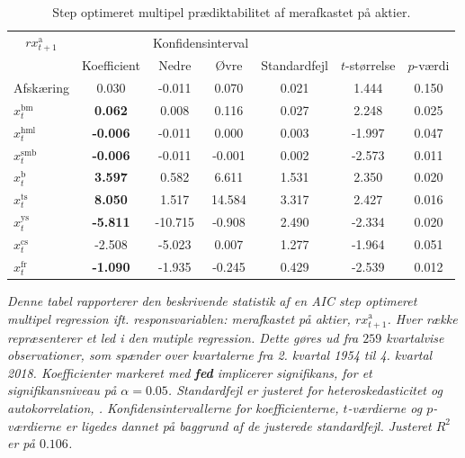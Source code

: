 \documentclass[
  a4paper,
  oneside]{memoir}
\begin{document}
\begin{table}[H]

\caption{\label{tab:MULT-step-ak}Step optimeret multipel prædiktabilitet af merafkastet på aktier.}
\centering
\begin{threeparttable}
\begin{tabular}[t]{lcccccc}
\toprule
\multicolumn{1}{c}{$rx_{t+1}^{\text{a}}$} & \multicolumn{1}{c}{ } & \multicolumn{2}{c}{Konfidensinterval} & \multicolumn{3}{c}{ } \\
\cmidrule(l{3pt}r{3pt}){1-1} \cmidrule(l{3pt}r{3pt}){3-4}
  & Koefficient & Nedre & Øvre & Standardfejl & $t$-størrelse & $p$-værdi\\
\midrule
\rowcolor{gray!6}  Afskæring & 0.030 & -0.011 & 0.070 & 0.021 & 1.444 & 0.150\\
$x_t^{\text{bm}}$ & \textbf{ 0.062} & 0.008 & 0.116 & 0.027 & 2.248 & 0.025\\
\rowcolor{gray!6}  $x_t^{\text{hml}}$ & \textbf{-0.006} & -0.011 & 0.000 & 0.003 & -1.997 & 0.047\\
$x_t^{\text{smb}}$ & \textbf{-0.006} & -0.011 & -0.001 & 0.002 & -2.573 & 0.011\\
\rowcolor{gray!6}  $x_t^{\text{b}}$ & \textbf{ 3.597} & 0.582 & 6.611 & 1.531 & 2.350 & 0.020\\
$x_t^{\text{ts}}$ & \textbf{ 8.050} & 1.517 & 14.584 & 3.317 & 2.427 & 0.016\\
\rowcolor{gray!6}  $x_t^{\text{ys}}$ & \textbf{-5.811} & -10.715 & -0.908 & 2.490 & -2.334 & 0.020\\
$x_t^{\text{cs}}$ & -2.508 & -5.023 & 0.007 & 1.277 & -1.964 & 0.051\\
\rowcolor{gray!6}  $x_t^{\text{fr}}$ & \textbf{-1.090} & -1.935 & -0.245 & 0.429 & -2.539 & 0.012\\
\bottomrule
\end{tabular}
\begin{tablenotes}
\item \textit{Denne tabel rapporterer den beskrivende statistik af en AIC step optimeret multipel regression ift. responsvariablen: merafkastet på aktier, $rx_{t+1}^{\text{a}}$. Hver række repræsenterer et led i den mutiple regression. Dette gøres ud fra $259$ kvartalvise observationer, som spænder over kvartalerne fra 2. kvartal 1954 til 4. kvartal 2018. Koefficienter markeret med \textbf{fed} implicerer signifikans, for et signifikansniveau på $\alpha=0.05$. Standardfejl er justeret for heteroskedasticitet og autokorrelation, \citep{Newey1987}. Konfidensintervallerne for koefficienterne, $t$-værdierne og $p$-værdierne er ligedes dannet på baggrund af de justerede standardfejl. Justeret $R^2$ er på $0.106$.}
\end{tablenotes}
\end{threeparttable}
\end{table}
\end{document}
